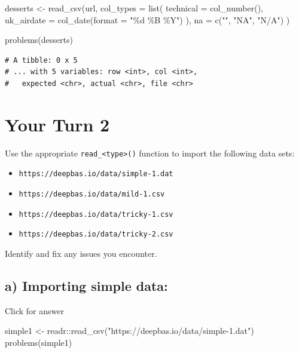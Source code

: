 \documentclass[
]{book}
\newenvironment{Shaded}{\begin{snugshade}}{\end{snugshade}}
\newcommand{\AttributeTok}[1]{\textcolor[rgb]{0.77,0.63,0.00}{#1}}
\newcommand{\FunctionTok}[1]{\textcolor[rgb]{0.00,0.00,0.00}{#1}}
\newcommand{\NormalTok}[1]{#1}
\newcommand{\OtherTok}[1]{\textcolor[rgb]{0.56,0.35,0.01}{#1}}
\newcommand{\SpecialCharTok}[1]{\textcolor[rgb]{0.00,0.00,0.00}{#1}}
\newcommand{\StringTok}[1]{\textcolor[rgb]{0.31,0.60,0.02}{#1}}
\begin{document}
\begin{Shaded}
\begin{Highlighting}[]
\NormalTok{desserts }\OtherTok{\textless{}{-}} \FunctionTok{read\_csv}\NormalTok{(url,}
  \AttributeTok{col\_types =} \FunctionTok{list}\NormalTok{(}
    \AttributeTok{technical =} \FunctionTok{col\_number}\NormalTok{(), }
    \AttributeTok{uk\_airdate =} \FunctionTok{col\_date}\NormalTok{(}\AttributeTok{format =} \StringTok{"\%d \%B \%Y"}\NormalTok{)}
\NormalTok{  ),}
  \AttributeTok{na =} \FunctionTok{c}\NormalTok{(}\StringTok{""}\NormalTok{, }\StringTok{"NA"}\NormalTok{, }\StringTok{"N/A"}\NormalTok{)}
\NormalTok{)}

\FunctionTok{problems}\NormalTok{(desserts)}
\end{Highlighting}
\end{Shaded}

\begin{verbatim}
# A tibble: 0 x 5
# ... with 5 variables: row <int>, col <int>,
#   expected <chr>, actual <chr>, file <chr>
\end{verbatim}

\hypertarget{your-turn-2-1}{%
\section{Your Turn 2}\label{your-turn-2-1}}

Use the appropriate \texttt{read\_\textless{}type\textgreater{}()} function to import the following data sets:

\begin{itemize}
\item
  \texttt{https://deepbas.io/data/simple-1.dat}
\item
  \texttt{https://deepbas.io/data/mild-1.csv}
\item
  \texttt{https://deepbas.io/data/tricky-1.csv}
\item
  \texttt{https://deepbas.io/data/tricky-2.csv}
\end{itemize}

Identify and fix any issues you encounter.

\hypertarget{a-importing-simple-data}{%
\subsection{a) Importing simple data:}\label{a-importing-simple-data}}

Click for answer

\begin{Shaded}
\begin{Highlighting}[]
\NormalTok{simple1 }\OtherTok{\textless{}{-}}\NormalTok{ readr}\SpecialCharTok{::}\FunctionTok{read\_csv}\NormalTok{(}\StringTok{"https://deepbas.io/data/simple{-}1.dat"}\NormalTok{)}
\FunctionTok{problems}\NormalTok{(simple1)}
\end{Highlighting}
\end{Shaded}
\end{document}

